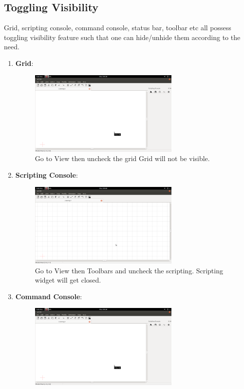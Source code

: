 \subsection{Toggling Visibility}
Grid, scripting console, command console, status bar, toolbar etc all possess toggling visibility feature such that one can hide/unhide them according to the need. 
\begin{enumerate}
\item \textbf{Grid}:
\begin{figure}[h!]
\centering
\includegraphics[width=0.7\textwidth]{images/togglegrig.png}\\
Go to View then uncheck the grid Grid will not be visible.
\end{figure}
\newpage
\item \textbf{Scripting Console}:
\begin{figure}[h!]
\centering
\includegraphics[width=0.7\textwidth]{images/togglescripting.png}\\
Go to View then Toolbars and uncheck the scripting. Scripting widget will get closed.
\end{figure}
\item \textbf{Command Console}:
\begin{figure}[h!]
\centering
\includegraphics[width=0.7\textwidth]{images/togglegrig.png}\\

\end{figure}
\end{enumerate}
